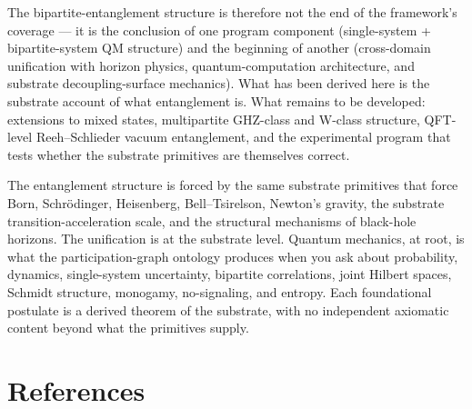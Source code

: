 \documentclass[11pt,a4paper]{article}
\begin{document}
The bipartite-entanglement structure is therefore not the end of the framework's coverage --- it is the conclusion of one program component (single-system + bipartite-system QM structure) and the beginning of another (cross-domain unification with horizon physics, quantum-computation architecture, and substrate decoupling-surface mechanics). What has been derived here is the substrate account of what entanglement is. What remains to be developed: extensions to mixed states, multipartite GHZ-class and W-class structure, QFT-level Reeh--Schlieder vacuum entanglement, and the experimental program that tests whether the substrate primitives are themselves correct.

The entanglement structure is forced by the same substrate primitives that force Born, Schr\"odinger, Heisenberg, Bell--Tsirelson, Newton's gravity, the substrate transition-acceleration scale, and the structural mechanisms of black-hole horizons. The unification is at the substrate level. Quantum mechanics, at root, is what the participation-graph ontology produces when you ask about probability, dynamics, single-system uncertainty, bipartite correlations, joint Hilbert spaces, Schmidt structure, monogamy, no-signaling, and entropy. Each foundational postulate is a derived theorem of the substrate, with no independent axiomatic content beyond what the primitives supply.

\section*{References}
\end{document}
